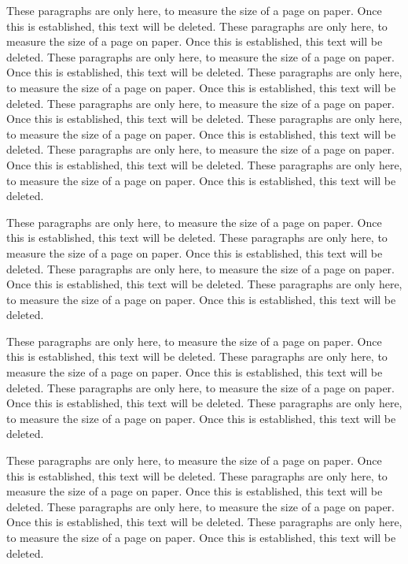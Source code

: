 These paragraphs are only here, to measure the size of a page on paper.
Once this is established, this text will be deleted.
These paragraphs are only here, to measure the size of a page on paper.
Once this is established, this text will be deleted.
These paragraphs are only here, to measure the size of a page on paper.
Once this is established, this text will be deleted.
These paragraphs are only here, to measure the size of a page on paper.
Once this is established, this text will be deleted.
These paragraphs are only here, to measure the size of a page on paper.
Once this is established, this text will be deleted.
These paragraphs are only here, to measure the size of a page on paper.
Once this is established, this text will be deleted.
These paragraphs are only here, to measure the size of a page on paper.
Once this is established, this text will be deleted.
These paragraphs are only here, to measure the size of a page on paper.
Once this is established, this text will be deleted.

These paragraphs are only here, to measure the size of a page on paper.
Once this is established, this text will be deleted.
These paragraphs are only here, to measure the size of a page on paper.
Once this is established, this text will be deleted.
These paragraphs are only here, to measure the size of a page on paper.
Once this is established, this text will be deleted.
These paragraphs are only here, to measure the size of a page on paper.
Once this is established, this text will be deleted.

These paragraphs are only here, to measure the size of a page on paper.
Once this is established, this text will be deleted.
These paragraphs are only here, to measure the size of a page on paper.
Once this is established, this text will be deleted.
These paragraphs are only here, to measure the size of a page on paper.
Once this is established, this text will be deleted.
These paragraphs are only here, to measure the size of a page on paper.
Once this is established, this text will be deleted.

These paragraphs are only here, to measure the size of a page on paper.
Once this is established, this text will be deleted.
These paragraphs are only here, to measure the size of a page on paper.
Once this is established, this text will be deleted.
These paragraphs are only here, to measure the size of a page on paper.
Once this is established, this text will be deleted.
These paragraphs are only here, to measure the size of a page on paper.
Once this is established, this text will be deleted.

